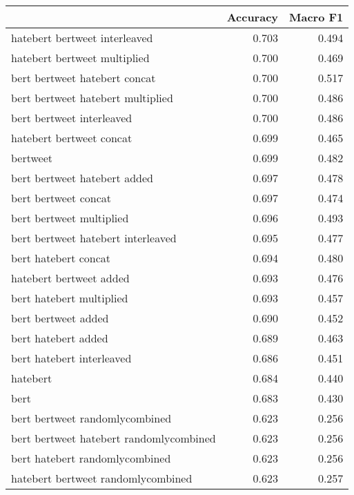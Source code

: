 \begin{tabular}{lrr}
\toprule
{} &  Accuracy &  Macro F1 \\
\midrule
hatebert bertweet interleaved            &     0.703 &     0.494 \\
hatebert bertweet multiplied             &     0.700 &     0.469 \\
bert bertweet hatebert concat            &     0.700 &     0.517 \\
bert bertweet hatebert multiplied        &     0.700 &     0.486 \\
bert bertweet interleaved                &     0.700 &     0.486 \\
hatebert bertweet concat                 &     0.699 &     0.465 \\
bertweet                                 &     0.699 &     0.482 \\
bert bertweet hatebert added             &     0.697 &     0.478 \\
bert bertweet concat                     &     0.697 &     0.474 \\
bert bertweet multiplied                 &     0.696 &     0.493 \\
bert bertweet hatebert interleaved       &     0.695 &     0.477 \\
bert hatebert concat                     &     0.694 &     0.480 \\
hatebert bertweet added                  &     0.693 &     0.476 \\
bert hatebert multiplied                 &     0.693 &     0.457 \\
bert bertweet added                      &     0.690 &     0.452 \\
bert hatebert added                      &     0.689 &     0.463 \\
bert hatebert interleaved                &     0.686 &     0.451 \\
hatebert                                 &     0.684 &     0.440 \\
bert                                     &     0.683 &     0.430 \\
bert bertweet randomlycombined           &     0.623 &     0.256 \\
bert bertweet hatebert randomlycombined  &     0.623 &     0.256 \\
bert hatebert randomlycombined           &     0.623 &     0.256 \\
hatebert bertweet randomlycombined       &     0.623 &     0.257 \\
\bottomrule
\end{tabular}
